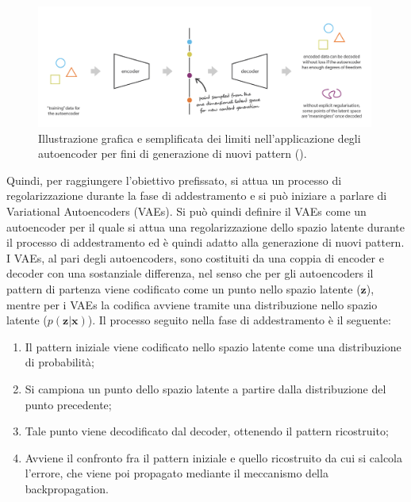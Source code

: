 \begin{figure}[h!]
	\centering
	\includegraphics[width=0.99\textwidth]{figs/limite_autoencoder.png}
	\caption{Illustrazione grafica e semplificata dei limiti nell'applicazione degli autoencoder per fini di generazione di nuovi pattern (\cite{Understanding_VAEs}).}
	\label{limite autoencoder}
\end{figure}

Quindi, per raggiungere l'obiettivo prefissato, si attua un processo di regolarizzazione durante la fase di addestramento e si può iniziare a parlare di Variational Autoencoders (VAEs). Si può quindi definire il VAEs come un autoencoder per il quale si attua una regolarizzazione dello spazio latente durante il processo di addestramento ed è quindi adatto alla generazione di nuovi pattern. \\
I VAEs, al pari degli autoencoders, sono costituiti da una coppia di encoder e decoder con una sostanziale differenza, nel senso che per gli autoencoders il pattern di partenza viene codificato come un punto nello spazio latente ($\textbf{z}$), mentre per i VAEs la codifica avviene tramite una distribuzione nello spazio latente ($p(\textbf{z}|\textbf{x})$). Il processo seguito nella fase di addestramento è il seguente:
\begin{enumerate}
	\item Il pattern iniziale viene codificato nello spazio latente come una distribuzione di probabilità;
	\item Si campiona un punto dello spazio latente a partire dalla distribuzione del punto precedente;
	\item Tale punto viene decodificato dal decoder, ottenendo il pattern ricostruito;
	\item Avviene il confronto fra il pattern iniziale e quello ricostruito da cui si calcola l'errore, che viene poi propagato mediante il meccanismo della backpropagation.
\end{enumerate}

